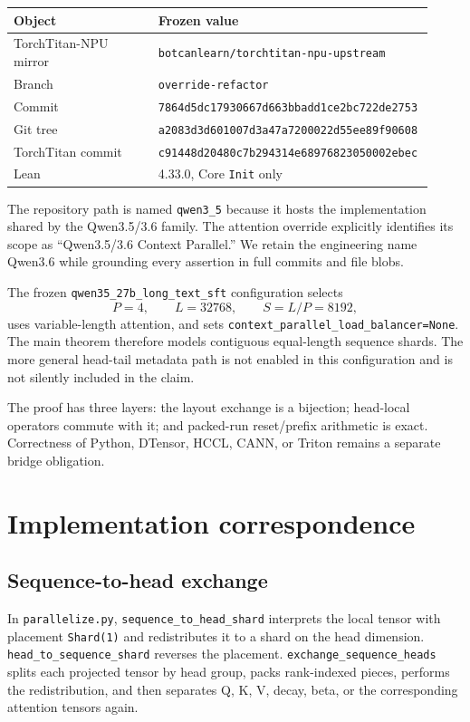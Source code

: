 \documentclass[11pt,a4paper]{article}
\begin{document}
\begin{center}
\begin{tabular}{p{0.34\linewidth}p{0.58\linewidth}}
\toprule
Object & Frozen value \\
\midrule
TorchTitan-NPU mirror & \texttt{botcanlearn/torchtitan-npu-upstream} \\
Branch & \texttt{override-refactor} \\
Commit & \texttt{7864d5dc17930667d663bbadd1ce2bc722de2753} \\
Git tree & \texttt{a2083d3d601007d3a47a7200022d55ee89f90608} \\
TorchTitan commit & \texttt{c91448d20480c7b294314e68976823050002ebec} \\
Lean & 4.33.0, Core \texttt{Init} only \\
\bottomrule
\end{tabular}
\end{center}

The repository path is named \texttt{qwen3\_5} because it hosts the implementation shared by the Qwen3.5/3.6 family. The attention override explicitly identifies its scope as ``Qwen3.5/3.6 Context Parallel.'' We retain the engineering name Qwen3.6 while grounding every assertion in full commits and file blobs.

The frozen \texttt{qwen35\_27b\_long\_text\_sft} configuration selects
\[
P=4,\qquad L=32768,\qquad S=L/P=8192,
\]
uses variable-length attention, and sets \texttt{context\_parallel\_load\_balancer=None}. The main theorem therefore models contiguous equal-length sequence shards. The more general head-tail metadata path is not enabled in this configuration and is not silently included in the claim.

The proof has three layers: the layout exchange is a bijection; head-local operators commute with it; and packed-run reset/prefix arithmetic is exact. Correctness of Python, DTensor, HCCL, CANN, or Triton remains a separate bridge obligation.

\section{Implementation correspondence}

\subsection{Sequence-to-head exchange}

In \texttt{parallelize.py}, \texttt{sequence\_to\_head\_shard} interprets the local tensor with placement \texttt{Shard(1)} and redistributes it to a shard on the head dimension. \texttt{head\_to\_sequence\_shard} reverses the placement. \texttt{exchange\_sequence\_heads} splits each projected tensor by head group, packs rank-indexed pieces, performs the redistribution, and then separates Q, K, V, decay, beta, or the corresponding attention tensors again.
\end{document}
